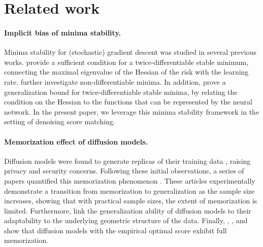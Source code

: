 \section{Related work}
\label{sec:related-work}
\paragraph{Implicit bias of minima stability.} Minima stability for (stochastic) gradient descent was studied in several previous works. \citet{wu2018sgd} provide a sufficient condition for a twice-differentiable stable minimum, connecting the maximal eigenvalue of the Hessian of the risk with the learning rate. \citet{mulayoff2021implicit} further investigate non-differentiable minima. In addition, \citet{qiao2024stableminimaoverfitunivariate} prove a generalization bound for twice-differentiable stable minima, by relating the condition on the Hessian to the functions that can be represented by the neural network. In the present paper, we leverage this minima stability framework in the setting of denoising score matching.

\paragraph{Memorization effect of diffusion models.} Diffusion models were found to generate replicas of their training data \citep[see, e.g.,][]{carlini2023extracting,somepalli2023diffusion, somepalli2023understanding}, raising privacy and security concerns. Following these initial observations, a series of papers quantified this memorization phenomenon \citep{gu2023memorization,yoon2023diffusion,kadkhodaie2023generalization}. These articles experimentally demonstrate a transition from memorization to generalization as the sample size increases, showing that with practical sample sizes, the extent of memorization is limited. Furthermore, \citet{kadkhodaie2023generalization} link the generalization ability of diffusion models to their adaptability to the underlying geometric structure of the data. Finally, \citet{gu2023memorization}, \citet{yi2023generalization}, and \citet{li2024good} show that diffusion models with the empirical optimal score exhibit full memorization.  

